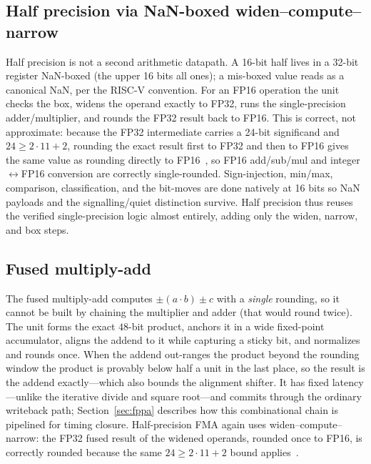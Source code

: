 \documentclass[conference]{IEEEtran}
\begin{document}
\subsection{Half precision via NaN-boxed widen--compute--narrow}
Half precision is not a second arithmetic datapath. A 16-bit half lives in a
32-bit register NaN-boxed (the upper 16 bits all ones); a mis-boxed value reads
as a canonical NaN, per the RISC-V convention. For an FP16 operation the unit
checks the box, widens the operand exactly to FP32, runs the single-precision
adder/multiplier, and rounds the FP32 result back to FP16. This is correct, not
approximate: because the FP32 intermediate carries a 24-bit significand and
$24 \ge 2\cdot 11 + 2$, rounding the exact result first to FP32 and then to FP16
gives the same value as rounding directly to FP16~\cite{figueroa}, so FP16
add/sub/mul and integer$\leftrightarrow$FP16 conversion are correctly
single-rounded. Sign-injection, min/max, comparison, classification, and the
bit-moves are done natively at 16 bits so NaN payloads and the signalling/quiet
distinction survive. Half precision thus reuses the verified single-precision
logic almost entirely, adding only the widen, narrow, and box steps.

\subsection{Fused multiply-add}
The fused multiply-add computes $\pm(a\cdot b)\pm c$ with a \emph{single} rounding,
so it cannot be built by chaining the multiplier and adder (that would round
twice). The unit forms the exact $48$-bit product, anchors it in a wide
fixed-point accumulator, aligns the addend to it while capturing a sticky bit,
and normalizes and rounds once. When the addend out-ranges the product beyond the
rounding window the product is provably below half a unit in the last place, so
the result is the addend exactly---which also bounds the alignment shifter. It
has fixed latency---unlike the iterative divide and square root---and commits
through the ordinary writeback path; Section~\ref{sec:fppa} describes how this
combinational chain is pipelined for timing closure. Half-precision
FMA again uses widen--compute--narrow: the FP32 fused result of the widened
operands, rounded once to FP16, is correctly rounded because the same $24\ge
2\cdot 11+2$ bound applies~\cite{figueroa}.
\end{document}
